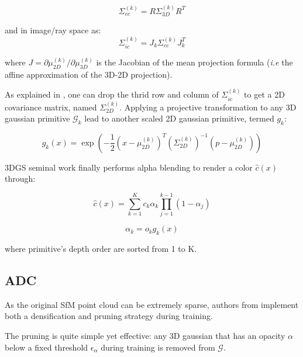 \begin{equation}
  \Sigma^{(k)}_{cc}= R\Sigma^{(k)}_{3D}R^{T}
  \label{eq:gs-3dcov-transfrom}
\end{equation}

and in image/ray space as:
\begin{equation}
  \Sigma^{(k)}_{ic}= J_{k}\Sigma^{(k)}_{cc}J_{k}^{T}
  \label{eq:gs-3d2dcov}
\end{equation}

where $J = \partial \mu^{(k)}_{2D} / \partial \mu^{(k)}_{3D}$ is the Jacobian of the mean projection formula (\textit{i.e} the affine approximation of the 3D-2D projection).


As explained in \cite{zwicker2001ewa}, one can drop the thrid row and column of  $ \Sigma^{(k)}_{ic}$ to get a 2D covariance matrix, named $\Sigma^{(k)}_{2D}$. Applying a projective transformation to any 3D gaussian primitive $\mathcal{G}_{k}$ lead to another scaled 2D gaussian primitive, termed $g_{k}$: 

\begin{equation}
  g_{k}(x) = \exp(-\frac{1}{2}(x-\mu^{(k)}_{2D})^{T}(\Sigma^{(k)}_{2D})^{-1}(p-\mu^{(k)}_{2D}))
\end{equation}

3DGS seminal work \cite{kerbl20233d} finally performs alpha blending to render a color $\hat{c}(x)$ through: 

\begin{equation}
\label{eq:gs-alpha-blending}
  \hat{c}(x) = \sum_{k=1}^{K}c_{k}\alpha_{k}\prod_{j=1}^{k-1}(1-\alpha_{j})
\end{equation}

\begin{equation}
\label{eq:gs-alpha-def}
  \alpha_{k} = o_{k}g_{k}(x)
\end{equation}

where primitive’s depth order are sorted from 1 to K. \newline

\subsection{ADC} 
As the original SfM point cloud can be extremely sparse, authors from \cite{kerbl20233d} implement both a densification and pruning strategy during training. 

The pruning is quite simple yet effective: any 3D gaussian that has an opacity $\alpha$ below a fixed threshold $\epsilon_{\alpha}$ during training is removed from $\mathcal{G}$. 

